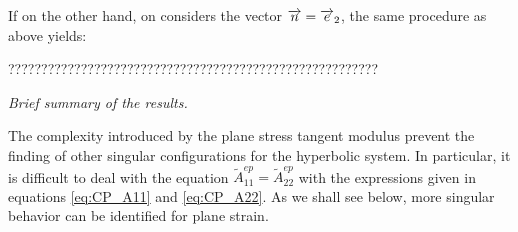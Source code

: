 
If on the other hand, on considers the vector ${\overrightarrow{n}}={\overrightarrow{e}}_2$, the same procedure as above yields:

????????????????????????????????????????????????????????

\textit{Brief summary of the results.}


The complexity introduced by the plane stress tangent modulus prevent the finding of other singular configurations for the hyperbolic system. 
In particular, it is difficult to deal with the equation $\tilde{A}^{ep}_{11}=\tilde{A}^{ep}_{22}$ with the expressions given in equations \eqref{eq:CP_A11} and \eqref{eq:CP_A22}.
As we shall see below, more singular behavior can be identified for plane strain.




